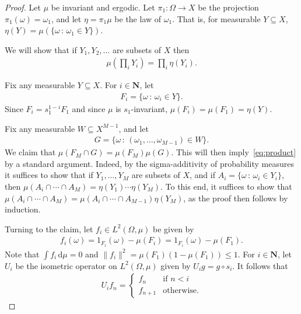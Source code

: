 \documentclass[10pt,a4paper]{amsart}
\newcommand{\NN}{\mathbf{N}}
\def\dd{\mathrm{d}}
\begin{document}
\begin{proof}
    Let $\mu$ be invariant and ergodic. Let $\pi_1 \colon \Omega \to X$ be the projection $\pi_1(\omega)=\omega_1$, and let $\eta = \pi_1\mu$ be the law of $\omega_1$. That is, for measurable $Y \subseteq X$, $\eta(Y) = \mu(\{\omega\,:\, \omega_1 \in Y\})$. 
    
    We will show that if $Y_1,Y_2,\ldots$ are subsets of $X$ then 
    \begin{align}
        \label{eq:product}
        \mu\left(\prod_i Y_i\right) = \prod_i \eta(Y_i).
    \end{align}

    Fix any measurable $Y \subseteq X$. For $i \in \NN$, let
    \begin{align*}
      F_i = \{\omega \,:\, \omega_i \in Y\}.
    \end{align*}
    Since $F_i = s_1^{1-i}F_1$ and since $\mu$ is $s_1$-invariant, $\mu(F_i) = \mu(F_1) = \eta(Y)$.

    Fix any measurable $W \subseteq X^{M-1}$, and let
    \begin{align*}
      G = \{\omega\,:\, (\omega_1,\ldots,\omega_{M-1}) \in W\}.
    \end{align*}
    We claim that $\mu(F_M \cap G) = \mu(F_M) \mu(G)$. This will then imply~\eqref{eq:product} by a standard argument. Indeed, by the sigma-additivity of probability measures it suffices to show that if $Y_1,\ldots,Y_M$ are subsets of $X$, and if $A_i = \{\omega\,:\,\omega_i \in Y_i\}$, then $\mu(A_i\cap \cdots \cap A_M) = \eta(Y_1)\cdots\eta(Y_M)$. To this end, it suffices to show that $\mu(A_i\cap \cdots \cap A_M) = \mu(A_i\cap \cdots \cap A_{M-1})\eta(Y_M)$, as the proof then follows by induction.

Turning to the claim, let $f_i \in L^2(\Omega,\mu)$ be given by
    \begin{align*}
      f_i(\omega) = 1_{F_i}(\omega)-\mu(F_i) = 1_{F_i}(\omega)-\mu(F_1).
    \end{align*}
    Note that $\int f_i\,\dd\mu = 0$ and $\| f_i \|^2 =  \mu(F_1)(1-\mu(F_1)) \leq 1$. For $i\in \NN$, let $U_i$ be the isometric operator on $L^2(\Omega,\mu)$ given by $U_ig = g \circ s_i$. It follows that
    \begin{align*}
      U_i f_n =
      \begin{cases}
        f_n&\text{if } n < i\\
        f_{n+1}&\text{otherwise.}
      \end{cases}
    \end{align*}


\end{proof}
\end{document}
